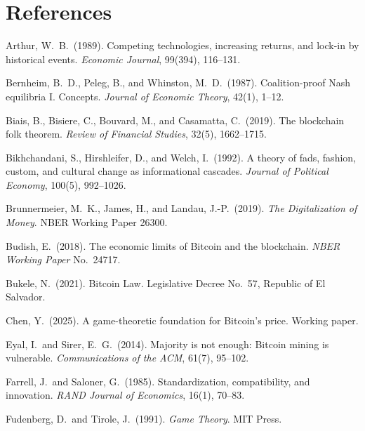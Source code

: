 \documentclass[12pt]{article}
\theoremstyle{definition}
\theoremstyle{remark}
\begin{document}
\section{References}

\begin{description}[style=nextline,leftmargin=0pt,labelsep=0pt,font=\normalfont]

\item Arthur, W.\ B.\ (1989). Competing technologies, increasing returns, and
lock-in by historical events. \emph{Economic Journal}, 99(394), 116--131.

\item Bernheim, B.\ D., Peleg, B., and Whinston, M.\ D.\ (1987). Coalition-proof
Nash equilibria I\@. Concepts. \emph{Journal of Economic Theory}, 42(1), 1--12.

\item Biais, B., Bisiere, C., Bouvard, M., and Casamatta, C.\ (2019). The
blockchain folk theorem. \emph{Review of Financial Studies}, 32(5), 1662--1715.

\item Bikhchandani, S., Hirshleifer, D., and Welch, I.\ (1992). A theory of
fads, fashion, custom, and cultural change as informational cascades.
\emph{Journal of Political Economy}, 100(5), 992--1026.

\item Brunnermeier, M.\ K., James, H., and Landau, J.-P.\ (2019). \emph{The
Digitalization of Money}. NBER Working Paper 26300.

\item Budish, E.\ (2018). The economic limits of Bitcoin and the blockchain.
\emph{NBER Working Paper} No.\ 24717.

\item Bukele, N.\ (2021). Bitcoin Law. Legislative Decree No.\ 57,
Republic of El Salvador.

\item Chen, Y.\ (2025). A game-theoretic foundation for Bitcoin's price.
Working paper.

\item Eyal, I.\ and Sirer, E.\ G.\ (2014). Majority is not enough: Bitcoin
mining is vulnerable. \emph{Communications of the ACM}, 61(7), 95--102.

\item Farrell, J.\ and Saloner, G.\ (1985). Standardization, compatibility,
and innovation. \emph{RAND Journal of Economics}, 16(1), 70--83.

\item Fudenberg, D.\ and Tirole, J.\ (1991). \emph{Game Theory}. MIT Press.


\end{description}
\end{document}
